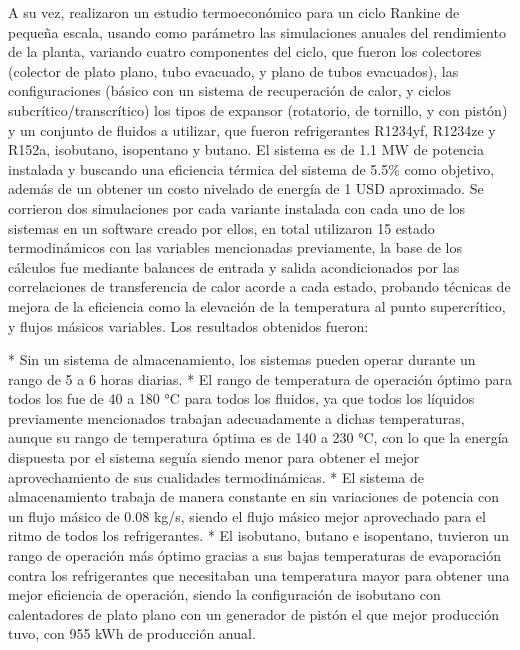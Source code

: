

A su vez, \textcite{wang1} realizaron un estudio termoeconómico para un ciclo Rankine de pequeña escala, usando como parámetro las simulaciones anuales del rendimiento de la planta, variando cuatro componentes del ciclo, que fueron los colectores (colector de plato plano, tubo evacuado, y plano de tubos evacuados), las configuraciones (básico con un sistema de recuperación de calor, y ciclos subcrítico/transcrítico) los tipos de expansor (rotatorio, de tornillo, y con pistón) y un conjunto de fluidos a utilizar, que fueron refrigerantes R1234yf, R1234ze y R152a, isobutano, isopentano y butano. El sistema es de 1.1 MW de potencia instalada y buscando una eficiencia térmica del sistema de 5.5\% como objetivo, además de un obtener un costo nivelado de energía de 1 USD aproximado. Se corrieron dos simulaciones por cada variante instalada con cada uno de los sistemas en un software creado por ellos, en total utilizaron 15 estado termodinámicos con las variables mencionadas previamente, la base de los cálculos fue mediante balances de entrada y salida acondicionados por las correlaciones de transferencia de calor acorde a cada estado, probando técnicas de mejora de la eficiencia como la elevación de la temperatura al punto supercrítico, y flujos másicos variables. Los resultados obtenidos fueron:


\begin{markdown}
* Sin un sistema de almacenamiento, los sistemas pueden operar durante un rango de 5 a 6 horas diarias.
* El rango de temperatura de operación óptimo para todos los fue de 40 a 180 °C para todos los fluidos, ya que todos los líquidos previamente mencionados trabajan adecuadamente a dichas temperaturas, aunque su rango de temperatura óptima es de 140 a 230 °C, con lo que la energía dispuesta por el sistema seguía siendo menor para obtener el mejor aprovechamiento de sus cualidades termodinámicas.
* El sistema de almacenamiento trabaja de manera constante en sin variaciones de potencia con un flujo másico de 0.08 kg/s, siendo el flujo másico mejor aprovechado para el ritmo de todos los refrigerantes.
* El isobutano, butano e isopentano, tuvieron un rango de operación más óptimo gracias a sus bajas temperaturas de evaporación contra los refrigerantes que necesitaban una temperatura mayor para obtener una mejor eficiencia de operación, siendo la configuración de isobutano con calentadores de plato plano con un generador de pistón el que mejor producción tuvo, con 955 kWh de producción anual.
\end{markdown}
